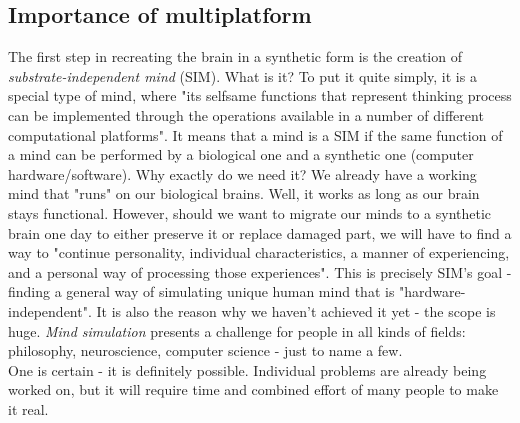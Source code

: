 \documentclass[12pt]{article}
\begin{document}
\subsection{Importance of multiplatform}
	The first step in recreating the brain in a synthetic form is the creation of \emph{substrate-independent mind} (SIM). What is it? To put it quite simply, it is a special type of mind, where "its selfsame functions that represent thinking process can be implemented through the operations available in a number of different computational platforms"\cite{sim:1}. It means that a mind is a SIM if the same function of a mind can be performed by a biological one and a synthetic one (computer hardware/software). Why exactly do we need it? We already have a working mind that "runs" on our biological brains. Well, it works as long as our brain stays functional. However, should we want to migrate our minds to a synthetic brain one day to either preserve it or replace damaged part, we will have to find a way to "continue personality, individual characteristics, a manner of experiencing, and a personal way of processing those experiences"\cite{sim:2}\cite{sim:3}. This is precisely SIM's goal - finding a general way of simulating unique human mind that is "hardware-independent". It is also the reason why we haven't achieved it yet - the scope is huge. \emph{Mind simulation} presents a challenge for people in all kinds of fields: philosophy, neuroscience, computer science - just to name a few.
	\\One is certain - it is definitely possible. Individual problems are already being worked on, but it will require time and combined effort of many people to make it real.
\end{document}
